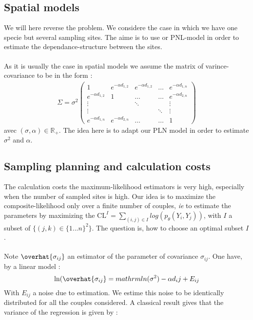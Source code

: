 \documentclass[11pt, a4paper]{article}
\begin{document}
\subsection{Spatial models}
We will here reverse the problem. We considere the case in which we have one specie but several sampling sites. The aime is to use or PNL-model in order to estimate the dependance-structure between the sites. \\
\\
As it is usually the case in spatial models \cite{cressie2015statistics} we assume the matrix of varince-covariance to be in the form :
\begin{align*}
\Sigma = \sigma^2 \begin{pmatrix}
1 &  e^{-\alpha d_{1,2}} &  e^{-\alpha d_{1,2}} & \ldots &  e^{- \alpha d_{1,n}}  \\
 e^{-\alpha d_{1,2}} & 1 & \ldots & \ldots &  e^{- \alpha d_{2,n}}\\
 \vdots & & \ddots & & \vdots\\
 \vdots & & & \ddots & \vdots \\
 e^{-\alpha d_{1,n}} &  e^{-\alpha d_{2,n}} & \ldots & \ldots & 1 
\end{pmatrix}
\end{align*}
avec $ (\sigma, \alpha) \in \mathbb{R}_{+}$.
The idea here is to adapt our PLN model in order to estimate $\sigma^2$ and $\alpha$. 

\subsection{Sampling planning and calculation costs}

The calculation costs the maximum-likelihood estimators is very high, especially when the number of sampled sites is high. Our idea is to maximize the composite-likelihood only over a finite number of couples, \textit{ie} to estimate the parameters by maximizing the $\mathrm{CL}^{I} = \sum_{(i,j) \in I} log( p_{\theta}(Y_i,Y_j))$, with $I$ a subset of $\{(j,k) \in \{1...n\}^2\}$. The question is, how to choose an optimal subset $I$.\\
\\
Note $\overhat{\sigma_{ij}}$ an estimator of the parameter of covariance $\sigma_{ij}$.
One have, by a linear model :
\begin{align*}
\mathrm{ln}(\overhat{\sigma_{ij}} = mathrm{ln} ( \sigma^2) - \alpha d_ij + E_{ij}
\end{align*}
With $E_{ij}$ a noise due to estimation. We estime this noise to be  identically distributed  for all the couples considered.
A classical result gives that the variance of the regression is given by : 


\end{document}
